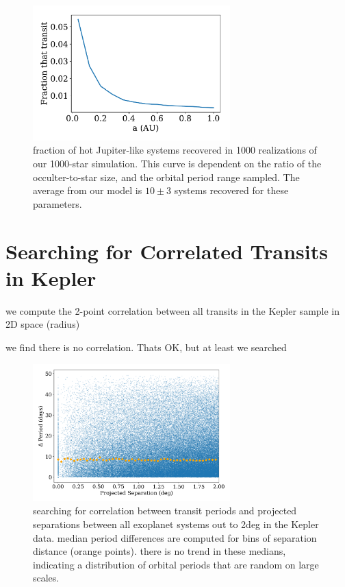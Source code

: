 \documentclass[modern]{aastex62}
\begin{document}
\begin{figure}[]
\centering
\includegraphics[width=3in]{../figures/recov_fraction.pdf}
\caption{fraction of hot Jupiter-like systems recovered in 1000 realizations of our 1000-star simulation. This curve is dependent on the ratio of the occulter-to-star size, and the orbital period range sampled.
The average from our model is $10\pm 3$ systems recovered for these parameters.}
\label{fig:recov}
\end{figure}





\section{Searching for Correlated Transits in Kepler}
we compute the 2-point correlation between all transits in the Kepler sample in 2D space (radius)

we find there is no correlation. Thats OK, but at least we searched

\begin{figure}[]
\centering
\includegraphics[width=3in]{../figures/delta_per.png}
\caption{searching for correlation between transit periods and projected separations between all exoplanet systems out to 2deg in the Kepler data. 
median period differences are computed for bins of separation distance (orange points).
there is no trend in these medians, indicating a distribution of orbital periods that are random on large scales.}
\label{fig:2dcor}
\end{figure}
\end{document}
